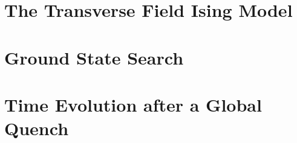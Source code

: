 \section{The Transverse Field Ising Model}
\label{sec:TFI_model}


\section{Ground State Search}
\label{sec:TFI_ground_state_search}


\section{Time Evolution after a Global Quench}
\label{sec:TFI_time_evolution}
